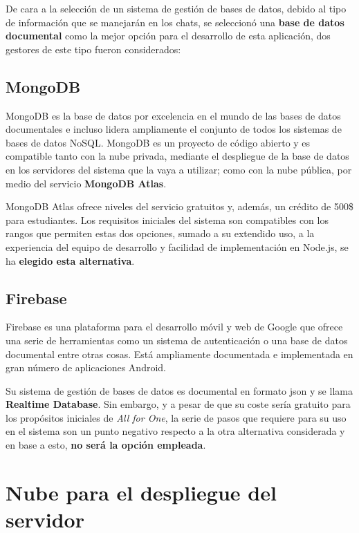 De cara a la selección de un sistema de gestión de bases de datos, debido al tipo de información que se manejarán en los chats, se seleccionó una \textbf{base de datos documental} como la mejor opción para el desarrollo de esta aplicación, dos gestores de este tipo fueron considerados:

\subsection{MongoDB}
\label{ssec:mongodb}

MongoDB es la base de datos por excelencia en el mundo de las bases de datos documentales e incluso lidera ampliamente el conjunto de todos los sistemas de bases de datos NoSQL\cite{dbEnginesRanking}. MongoDB es un proyecto de código abierto y es compatible tanto con la nube privada, mediante el despliegue de la base de datos en los servidores del sistema que la vaya a utilizar; como con la nube pública, por medio del servicio \textbf{MongoDB Atlas}.

MongoDB Atlas ofrece niveles del servicio gratuitos y, además, un crédito de 500\$ para estudiantes. Los requisitos iniciales del sistema son compatibles con los rangos que permiten estas dos opciones, sumado a su extendido uso, a la experiencia del equipo de desarrollo y facilidad de implementación en Node.js, se ha \textbf{elegido esta alternativa}.

\subsection{Firebase}

Firebase es una plataforma para el desarrollo móvil y web de Google que ofrece una serie de herramientas como un sistema de autenticación o una base de datos documental entre otras cosas. Está ampliamente documentada e implementada en gran número de aplicaciones Android.

Su sistema de gestión de bases de datos es documental en formato \acrshort{json} y se llama \textbf{Realtime Database}. Sin embargo, y a pesar de que su coste sería gratuito para los propósitos iniciales de \emph{All for One}, la serie de pasos que requiere para su uso en el sistema son un punto negativo respecto a la otra alternativa considerada y en base a esto, \textbf{no será la opción empleada}.

\section{Nube para el despliegue del servidor}

